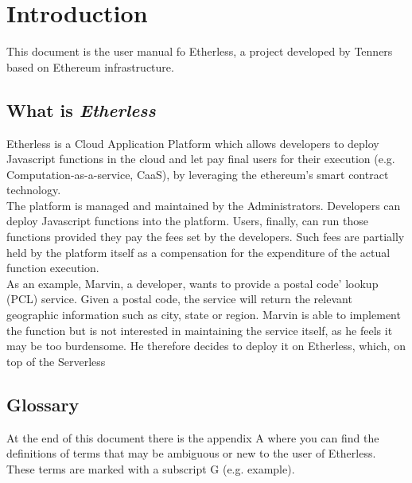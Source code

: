 \section{Introduction}
This document is the user manual fo Etherless, a project developed by Tenners based on Ethereum infrastructure.

\subsection{What is \textit{Etherless}}
Etherless is a Cloud Application Platform which allows developers to deploy Javascript functions in the cloud and let pay final users for their execution (e.g. Computation-as-a-service, CaaS), by leveraging the ethereum's smart contract technology.\\
The platform is managed and maintained by the Administrators. 
Developers can deploy Javascript functions into the platform. Users, finally, can run those functions provided they pay the fees set by the developers. Such fees are partially held by the platform itself as a compensation for the expenditure of the actual function execution.\\
As an example, Marvin, a developer, wants to provide a postal code' lookup (PCL) service. Given a postal 
code, the service will return the relevant geographic information such as city, state or region. Marvin is able 
to implement the function but is not interested in maintaining the service itself, as he feels it may be too 
burdensome. He therefore decides to deploy it on Etherless, which, on top of the Serverless

\subsection{Glossary}
At the end of this document there is the appendix A where you can find the definitions of terms that may be ambiguous or new to the user of Etherless. These terms are marked with a subscript G (e.g. example\glos).
